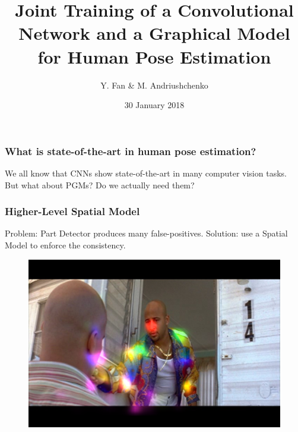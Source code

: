 \documentclass{beamer}
\title[Joint Training of CNN and PGM for HPE]{\textbf{Joint Training of a Convolutional Network and a Graphical Model for Human Pose Estimation}}
\subtitle{}
\author{Y. Fan \& M. Andriushchenko}
\institute{Saarland Univ.}
\date{30 January 2018}
\begin{document}
	
	\begin{frame}
		\titlepage
	\end{frame}

    \begin{frame}[t]
        \frametitle{What is state-of-the-art in \textbf{human pose estimation}?}
        \begin{center}
            We all know that CNNs show state-of-the-art in many computer vision tasks. \\
            But what about PGMs? Do we actually need them?
        \end{center}
    \end{frame}





	\begin{frame}[t]
        \frametitle{Higher-Level Spatial Model}
        \begin{center}
            Problem: Part Detector produces many false-positives. \newline \newline
			Solution: use a Spatial Model to enforce the consistency.\\
        \end{center}
         \begin{figure}[htbp] %
            \includegraphics[scale=0.55]{false_positive.png}
         \end{figure}
    \end{frame}
\end{document}
